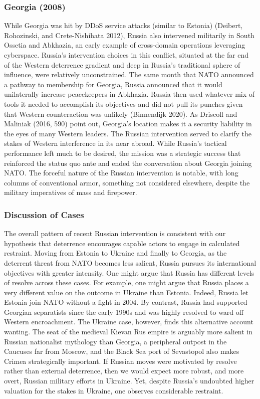 \documentclass[
]{article}
\begin{document}
\hypertarget{georgia-2008}{%
\subsubsection{Georgia (2008)}\label{georgia-2008}}

While Georgia was hit by DDoS service attacks (similar to Estonia) (Deibert, Rohozinski, and Crete-Nishihata 2012), Russia also intervened militarily in South Ossetia and Abkhazia, an early example of cross-domain operations leveraging cyberspace. Russia's intervention choices in this conflict, situated at the far end of the Western deterrence gradient and deep in Russia's traditional sphere of influence, were relatively unconstrained. The same month that NATO announced a pathway to membership for Georgia, Russia announced that it would unilaterally increase peacekeepers in Abkhazia. Russia then used whatever mix of tools it needed to accomplish its objectives and did not pull its punches given that Western counteraction was unlikely (Binnendijk 2020). As Driscoll and Maliniak (2016, 590) point out, Georgia's location makes it a security liability in the eyes of many Western leaders. The Russian intervention served to clarify the stakes of Western interference in its near abroad. While Russia's tactical performance left much to be desired, the mission was a strategic success that reinforced the status quo ante and ended the conversation about Georgia joining NATO. The forceful nature of the Russian intervention is notable, with long columns of conventional armor, something not considered elsewhere, despite the military imperatives of mass and firepower.

\hypertarget{discussion-of-cases}{%
\subsubsection{Discussion of Cases}\label{discussion-of-cases}}

The overall pattern of recent Russian intervention is consistent with our hypothesis that deterrence encourages capable actors to engage in calculated restraint. Moving from Estonia to Ukraine and finally to Georgia, as the deterrent threat from NATO becomes less salient, Russia pursues its international objectives with greater intensity. One might argue that Russia has different levels of resolve across these cases. For example, one might argue that Russia places a very different value on the outcome in Ukraine than Estonia. Indeed, Russia let Estonia join NATO without a fight in 2004. By contrast, Russia had supported Georgian separatists since the early 1990s and was highly resolved to ward off Western encroachment. The Ukraine case, however, finds this alternative account wanting. The seat of the medieval Kievan Rus empire is arguably more salient in Russian nationalist mythology than Georgia, a peripheral outpost in the Caucuses far from Moscow, and the Black Sea port of Sevastopol also makes Crimea strategically important. If Russian moves were motivated by resolve rather than external deterrence, then we would expect more robust, and more overt, Russian military efforts in Ukraine. Yet, despite Russia's undoubted higher valuation for the stakes in Ukraine, one observes considerable restraint.
\end{document}
